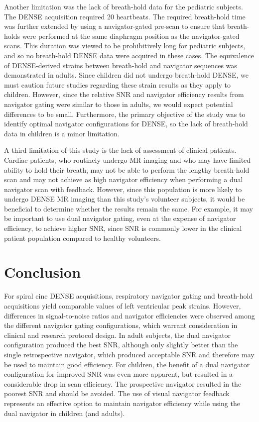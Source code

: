 	Another limitation was the lack of breath-hold data for the pediatric subjects. The DENSE acquisition required 20 heartbeats. The required breath-hold time was further extended by using a navigator-gated pre-scan to ensure that breath-holds were performed at the same diaphragm position as the navigator-gated scans. This duration was viewed to be prohibitively long for pediatric subjects, and so no breath-hold DENSE data were acquired in these cases. The equivalence of DENSE-derived strains between breath-hold and navigator sequences was demonstrated in adults. Since children did not undergo breath-hold DENSE, we must caution future studies regarding these strain results as they apply to children. However, since the relative SNR and navigator efficiency results from navigator gating were similar to those in adults, we would expect potential differences to be small. Furthermore, the primary objective of the study was to identify optimal navigator configurations for DENSE, so the lack of breath-hold data in children is a minor limitation.
	
	A third limitation of this study is the lack of assessment of clinical patients. Cardiac patients, who routinely undergo MR imaging and who may have limited ability to hold their breath, may not be able to perform the lengthy breath-hold scan and may not achieve as high navigator efficiency when performing a dual navigator scan with feedback. However, since this population is more likely to undergo DENSE MR imaging than this study's volunteer subjects, it would be beneficial to determine whether the results remain the same. For example, it may be important to use dual navigator gating, even at the expense of navigator efficiency, to achieve higher SNR, since SNR is commonly lower in the clinical patient population compared to healthy volunteers.

\section{Conclusion}
	For spiral cine DENSE acquisitions, respiratory navigator gating and breath-hold acquisitions yield comparable values of left ventricular peak strains. However, differences in signal-to-noise ratios and navigator efficiencies were observed among the different navigator gating configurations, which warrant consideration in clinical and research protocol design. In adult subjects, the dual navigator configuration produced the best SNR, although only slightly better than the single retrospective navigator, which produced acceptable SNR and therefore may be used to maintain good efficiency. For children, the benefit of a dual navigator configuration for improved SNR was even more apparent, but resulted in a considerable drop in scan efficiency. The prospective navigator resulted in the poorest SNR and should be avoided. The use of visual navigator feedback represents an effective option to maintain navigator efficiency while using the dual navigator in children (and adults).